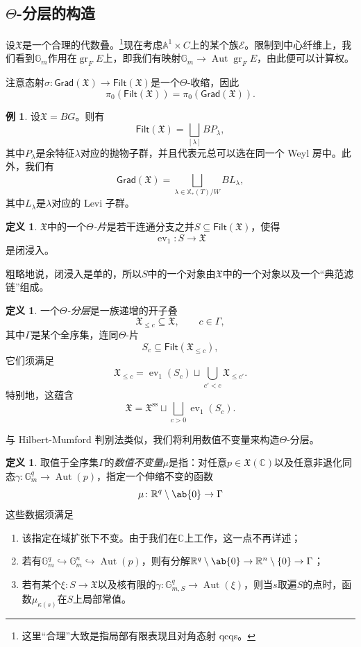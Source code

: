 \documentclass{amsart}
\theoremstyle{definition}
\newtheorem{defn}[thm]{定义}
\newtheorem{exm}[thm]{例}
\theoremstyle{remark}
\theoremstyle{plain}
\theoremstyle{definition}
\theoremstyle{remark}
\newcommand{\A}{\mathbb{A}}
\newcommand{\G}{\mathbb{G}}
\newcommand{\R}{\mathbb{R}}
\newcommand{\C}{\mathbb{C}}
\newcommand{\mc}[1]{\mathcal{#1}}
\newcommand{\mf}[1]{\mathfrak{#1}}
\newcommand{\mr}[1]{\mathrm{#1}}
\newcommand{\on}[1]{\operatorname{#1}}
\newcommand{\ms}[1]{\mathsf{#1}}
\newcommand{\1}{\mathbf{1}}
\newcommand{\2}{\mathbf{2}}
\newcommand{\3}{\mathbf{3}}
\DeclareMathOperator{\Aut}{Aut}
\DeclareMathOperator{\ev}{ev}
\begin{document}
\subsection{\texorpdfstring{\(\Theta\)}{Θ}-分层的构造}%
\label{sub:Construction of Theta-stratifications}

设\(\mf{X}\)是一个合理的代数叠。\footnote{这里“合理”大致是指局部有限表现且对角态射 qcqs。}现在考虑\(\A^1 \times C\)上的某个族\(\mc{E}\)。限制到中心纤维上，我们看到\(\G_m\)作用在\(\on{gr}_F E\)上，即我们有映射\(\G_m \to \Aut \on{gr}_F E\)，由此便可以计算权。

注意态射\(\sigma \colon \ms{Grad}(\mf{X}) \to \ms{Filt}(\mf{X})\)是一个\(\Theta\)-收缩，因此
\[ \pi_0(\ms{Filt}(\mf{X})) = \pi_0(\ms{Grad}(\mf{X})). \]

\begin{exm}
    设\(\mf{X} = BG\)。则有
    \[\ms{Filt}(\mf{X}) = \bigsqcup_{[\lambda]} B P_{\lambda}, \]
    其中\(P_{\lambda}\)是余特征\(\lambda\)对应的抛物子群，并且代表元总可以选在同一个 Weyl 房中。此外，我们有
    \[ \ms{Grad}(\mf{X}) = \bigsqcup_{\lambda \in \mathbb{X}_*(T)/W} B L_{\lambda}, \]
    其中\(L_{\lambda}\)是\(\lambda\)对应的 Levi 子群。
\end{exm}

\begin{defn}
    \(\mf{X}\)中的一个\textit{\(\Theta\)-片}是若干连通分支之并\(S \subseteq \ms{Filt}(\mf{X})\)，使得
    \[ \ev_1 \colon S \to \mf{X} \]
    是闭浸入。
\end{defn}

粗略地说，闭浸入是单的，所以\(S\)中的一个对象由\(\mf{X}\)中的一个对象以及一个“典范滤链”组成。

\begin{defn}
    一个\textit{\(\Theta\)-分层}是一族递增的开子叠
    \[ \mf{X}_{\leq c} \subseteq \mf{X}, \qquad c \in \Gamma, \]
    其中\(\Gamma\)是某个全序集，连同\(\Theta\)-片
    \[ S_c \subseteq \ms{Filt}(\mf{X}_{\leq c}), \]
    它们须满足
    \[ \mf{X}_{\leq c} = \ev_1(S_c) \sqcup \bigcup_{c' < c} \mf{X}_{\leq c'}. \]
    特别地，这蕴含
    \[ \mf{X} = \mf{X}^{\mr{ss}} \sqcup \bigsqcup_{c > 0} \ev_1(S_c). \]
\end{defn}

与 Hilbert-Mumford 判别法类似，我们将利用数值不变量来构造\(\Theta\)-分层。
\begin{defn}
    取值于全序集\(\Gamma\)的\textit{数值不变量}\(\mu\)是指：对任意\(p \in \mf{X}(\C)\)以及任意非退化同态\(\gamma \colon \G_m^q \to \Aut(p)\)，指定一个伸缩不变的函数
    \[ \mu \colon \R^q \setminus \ab\{0\} \to \Gamma \]
    这些数据须满足
    \begin{enumerate}
        \item 该指定在域扩张下不变。由于我们在\(\C\)上工作，这一点不再详述；
        \item 若有\(\G_m^q \hookrightarrow \G_m^n \hookrightarrow \Aut(p)\)，则有分解\(\R^q \setminus \ab\{0\} \to \R^n \setminus \{0\} \to \Gamma\)；
        \item 若有某个\(\xi \colon S \to \mf{X}\)以及核有限的\(\gamma \colon \G_{m, S}^q \to \Aut(\xi)\)，则当\(s\)取遍\(S\)的点时，函数\(\mu_{\kappa(s)}\)在\(S\)上局部常值。
    \end{enumerate}
\end{defn}
\end{document}
